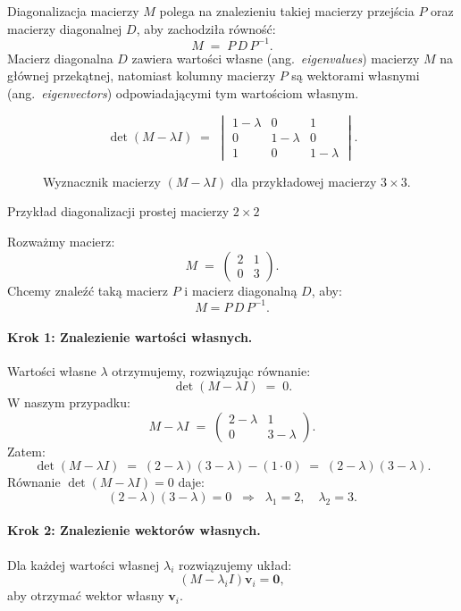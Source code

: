\vspace{1em}
\noindent

Diagonalizacja macierzy \(M\) polega na znalezieniu takiej macierzy przejścia \(P\) oraz macierzy diagonalnej \(D\), aby zachodziła równość:
\[
M \;=\; P \,D\, P^{-1}.
\]
Macierz diagonalna \(D\) zawiera wartości własne (ang.~\emph{eigenvalues}) macierzy \(M\) na głównej przekątnej, natomiast kolumny macierzy \(P\) są wektorami własnymi (ang.~\emph{eigenvectors}) odpowiadającymi tym wartościom własnym.


\begin{figure}[h!]
    \centering
    \begin{equation*}
    \det(M - \lambda I) 
    \;=\;
    \begin{vmatrix}
    1 - \lambda & 0 & 1 \\
    0 & 1 - \lambda & 0 \\
    1 & 0 & 1 - \lambda
    \end{vmatrix}.
    \end{equation*}
    \caption{Wyznacznik macierzy $(M - \lambda I)$ dla przykładowej macierzy $3\times3$.}
    \label{fig:matrix-determinant}
\end{figure}


Przykład diagonalizacji prostej macierzy \(2 \times 2\)

Rozważmy macierz:
\[
M \;=\;
\begin{pmatrix}
2 & 1 \\
0 & 3
\end{pmatrix}.
\]
Chcemy znaleźć taką macierz \(P\) i macierz diagonalną \(D\), aby:
\[
M = P\,D\,P^{-1}.
\]

\paragraph{Krok 1: Znalezienie wartości własnych.}
Wartości własne \(\lambda\) otrzymujemy, rozwiązując równanie:
\[
\det(M - \lambda I) \;=\; 0.
\]
W naszym przypadku:
\[
M - \lambda I \;=\;
\begin{pmatrix}
2-\lambda & 1 \\
0 & 3-\lambda
\end{pmatrix}.
\]
Zatem:
\[
\det(M - \lambda I) 
\;=\; (2-\lambda)(3-\lambda) - (1 \cdot 0)
\;=\; (2-\lambda)(3-\lambda).
\]
Równanie \(\det(M - \lambda I) = 0\) daje:
\[
(2-\lambda)(3-\lambda) = 0
\;\;\Longrightarrow\;\;
\lambda_1 = 2, 
\quad \lambda_2 = 3.
\]

\paragraph{Krok 2: Znalezienie wektorów własnych.}
Dla każdej wartości własnej \(\lambda_i\) rozwiązujemy układ:
\[
(M - \lambda_i I)\mathbf{v}_i = \mathbf{0},
\]
aby otrzymać wektor własny \(\mathbf{v}_i\).

